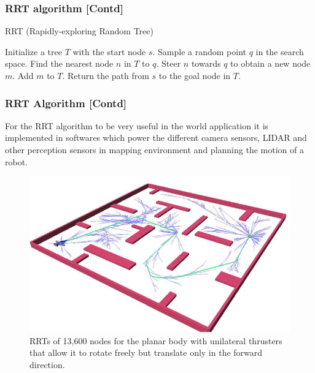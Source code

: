 \documentclass{beamer}
\begin{document}
\begin{frame}[fragile]
    \frametitle{RRT algorithm [Contd]}
    \begin{algorithm}[H]
        \caption{RRT (Rapidly-exploring Random Tree)}
        \begin{algorithmic}[1]
            \STATE Initialize a tree $T$ with the start node $s$.
            \STATE Sample a random point $q$ in the search space.
            \STATE Find the nearest node $n$ in $T$ to $q$.
            \STATE Steer $n$ towards $q$ to obtain a new node $m$.
            \STATE Add $m$ to $T$.
            \ENDIF
            \ENDFOR
            \STATE Return the path from $s$ to the goal node in $T$.
        \end{algorithmic}
    \end{algorithm}
\end{frame}

\begin{frame}
    \frametitle{RRT Algorithm [Contd]}
    For the RRT algorithm to be very useful in the world application it is implemented in softwares which power the different camera sensors, LIDAR and other perception sensors in mapping environment and planning the motion of a robot.
    \begin{figure}[h]
        \centering
        \includegraphics[scale=0.3]{../images/rrt1.png}
        \caption{RRTs of 13,600 nodes for the planar body with unilateral thrusters that allow it to rotate freely but translate only in the forward direction.}
    \end{figure}
\end{frame}
\end{document}
